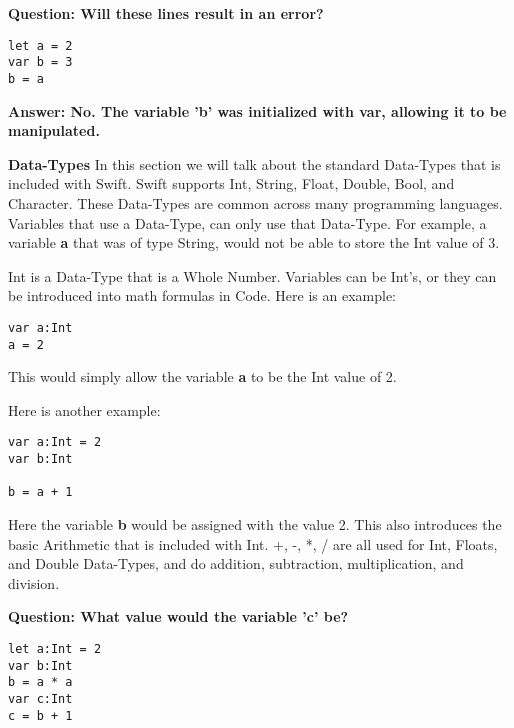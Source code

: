\documentclass{article}
\theoremstyle{theorem}
\theoremstyle{definition}
\theoremstyle{remark}
\begin{document}
\noindent\newline\newline \textbf{Question: Will these lines result in an error?}
\begin{verbatim}
let a = 2
var b = 3
b = a
\end{verbatim}

\noindent\newline \textbf{Answer: No. The variable 'b' was initialized with var, allowing it to be manipulated.}


\noindent\newline\newline\newline \textbf{Data-Types}\newline
\noindent In this section we will talk about the standard Data-Types that is included with Swift. Swift supports Int, String, Float, Double, Bool, and Character. These Data-Types are common across many programming languages. Variables that use a Data-Type, can only use that Data-Type. For example, a variable \textbf{a} that was of type String, would not be able to store the Int value of 3.

\noindent\newline\newline Int is a Data-Type that is a Whole Number. Variables can be Int's, or they can be introduced into math formulas in Code. Here is an example:

\begin{verbatim}
var a:Int
a = 2
\end{verbatim}
\noindent\newline This would simply allow the variable \textbf{a} to be the Int value of 2.

\noindent\newline Here is another example:
\begin{verbatim}
var a:Int = 2
var b:Int

b = a + 1

\end{verbatim}
\noindent\newline Here the variable \textbf{b} would be assigned with the value 2. This also introduces the basic Arithmetic that is included with Int. +, -, *, / are all used for Int, Floats, and Double Data-Types, and do addition, subtraction, multiplication, and division.

\noindent\newline\newline \textbf{Question: What value would the variable 'c' be?}
\begin{verbatim}
let a:Int = 2
var b:Int
b = a * a
var c:Int
c = b + 1
\end{verbatim}
\end{document}
